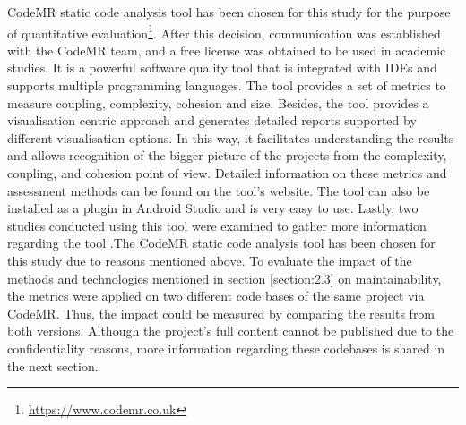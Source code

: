 CodeMR static code analysis tool has been chosen for this study for the purpose of quantitative evaluation\footnote{\url{https://www.codemr.co.uk}}. After this decision, communication was established with the CodeMR team, and a free license was obtained to be used in academic studies. It is a powerful software quality tool that is integrated with IDEs and supports multiple programming languages. The tool provides a set of metrics to measure coupling, complexity, cohesion and size. Besides, the tool provides a visualisation centric approach and generates detailed reports supported by different visualisation options. In this way, it facilitates understanding the results and allows recognition of the bigger picture of the projects from the complexity, coupling, and cohesion point of view. Detailed information on these metrics and assessment methods can be found on the tool's website. The tool can also be installed as a plugin in Android Studio and is very easy to use. Lastly, two studies conducted using this tool were examined to gather more information regarding the tool \cite{38,39}.The CodeMR static code analysis tool has been chosen for this study due to reasons mentioned above. To evaluate the impact of the methods and technologies mentioned in section \ref{section:2.3} on maintainability, the metrics were applied on two different code bases of the same project via CodeMR. Thus, the impact could be measured by comparing the results from both versions. Although the project's full content cannot be published due to the confidentiality reasons, more information regarding these codebases is shared in the next section.
